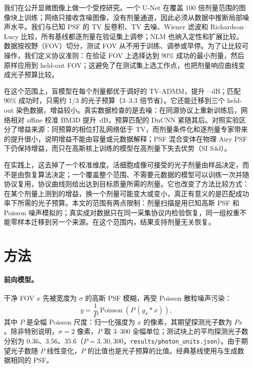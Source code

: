 \documentclass[11pt]{ctexart}
\begin{document}
我们在公开显微图像上做一个受控研究。一个 U-Net 在覆盖 100 倍剂量范围的图像块上训练；网络只接收含噪图像，没有剂量通道，因此必须从数据中推断局部噪声水平。我们与已知 PSF 的 TV 反卷积、TV 去噪、Wiener 滤波和 Richardson--Lucy 比较，所有基线都逐剂量在验证集上调参；NLM 也纳入定性和扩展比较。数据按视野（FOV）切分，测试 FOV 从不用于训练、调参或早停。为了让比较可操作，我们定义协议准则：在验证 FOV 上选择达到 90\% 成功的最小剂量，然后原样应用到 held-out FOV；这避免了在测试集上选工作点，也把剂量响应曲线变成光子预算比较。

在这个范围上，盲模型在每个剂量都优于调好的 TV-ADMM，提升 \BestGainMin--\BestGainMax\,dB；匹配 90\% 成功时，只需约 1/3 的光子预算（3--3.3 倍节省）。它还能迁移到三个 held-out 染色数据，增益较小。真实数据检查的是去噪：在同源协议上重新训练后，网络相对 affine 校准 BM3D 提升 \RealGain\,dB，预算匹配的 DnCNN 紧随其后。对照实验区分了增益来源：同预算的相位打乱网络低于 TV，而剂量条件化和逐剂量专家带来的提升很小，说明增益不能由容量或元数据解释；PSF 混合变体在物理 Airy PSF 下仍保持增益，而只在高斯核上训练的模型在高剂量下失去优势（SI S4d）。

在实践上，这去掉了一个校准维度。活细胞成像可接受的光子剂量由样品决定，而不是由恢复算法决定；一个覆盖整个范围、不需要元数据的模型可以训练一次并随协议复用，协议曲线则给出达到目标质量所需的剂量。它也改变了方法比较方式：在某个剂量上测到的增益，换一个剂量可能变大或变小，真正有意义的是匹配成功率下所需的光子预算。本文的范围有两点限制：剂量扫描是用已知高斯 PSF 和 Poisson 噪声模拟的；真实成对数据只在同一采集协议内检验恢复，同一组权重不能零样本迁移到另一个来源。在这个范围内，结果支持剂量无关恢复。

\section{方法}
\paragraph{前向模型。}
干净 FOV $x$ 先被宽度为 $\sigma$ 的高斯 PSF 模糊，再受 Poisson 散粒噪声污染：
\begin{equation}
y=\frac{1}{P}\operatorname{Poisson}\!\left(P\,(g_\sigma * x)\right),
\label{eq:forward}
\end{equation}
其中 $P$ 是全幅 Poisson 尺度：归一化强度为 $x$ 的像素，其期望探测光子数为 $Px$。除非特别说明，$\sigma=2$ 像素，$P$ 取 3--300 全幅单位；测试块上的平均探测光子数分别为 0.36、3.56、35.6（$P=3,30,300$，\texttt{results/photon\_units.json}）。由于期望光子数随 $P$ 线性变化，$P$ 的比值也是光子预算的比值。经典基线使用与生成数据相同的 PSF。
\end{document}

